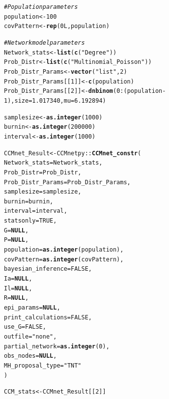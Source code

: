 \documentclass{article}\usepackage[]{graphicx}\usepackage[]{xcolor}
\makeatletter
\newcommand{\hlnum}[1]{\textcolor[rgb]{0.686,0.059,0.569}{#1}}%
\newcommand{\hlsng}[1]{\textcolor[rgb]{0.192,0.494,0.8}{#1}}%
\newcommand{\hlcom}[1]{\textcolor[rgb]{0.678,0.584,0.686}{\textit{#1}}}%
\newcommand{\hlopt}[1]{\textcolor[rgb]{0,0,0}{#1}}%
\newcommand{\hldef}[1]{\textcolor[rgb]{0.345,0.345,0.345}{#1}}%
\newcommand{\hlkwa}[1]{\textcolor[rgb]{0.161,0.373,0.58}{\textbf{#1}}}%
\newcommand{\hlkwb}[1]{\textcolor[rgb]{0.69,0.353,0.396}{#1}}%
\newcommand{\hlkwc}[1]{\textcolor[rgb]{0.333,0.667,0.333}{#1}}%
\newcommand{\hlkwd}[1]{\textcolor[rgb]{0.737,0.353,0.396}{\textbf{#1}}}%
\newenvironment{kframe}{%
 \def\at@end@of@kframe{}%
 \ifinner\ifhmode%
  \def\at@end@of@kframe{\end{minipage}}%
  \begin{minipage}{\columnwidth}%
 \fi\fi%
 \def\FrameCommand##1{\hskip\@totalleftmargin \hskip-\fboxsep
 \colorbox{shadecolor}{##1}\hskip-\fboxsep
     \hskip-\linewidth \hskip-\@totalleftmargin \hskip\columnwidth}%
 \MakeFramed {\advance\hsize-\width
   \@totalleftmargin\z@ \linewidth\hsize
   \@setminipage}}%
 {\par\unskip\endMakeFramed%
 \at@end@of@kframe}
\makeatother
\begin{document}
\begin{kframe}
\begin{alltt}
\hlcom{# Population parameters}
\hldef{population} \hlkwb{<-} \hlnum{100}
\hldef{covPattern} \hlkwb{<-} \hlkwd{rep}\hldef{(}\hlnum{0L}\hldef{, population)}

\hlcom{# Network model parameters}
\hldef{Network_stats} \hlkwb{<-} \hlkwd{list}\hldef{(}\hlkwd{c}\hldef{(}\hlsng{"Degree"}\hldef{))}
\hldef{Prob_Distr} \hlkwb{<-} \hlkwd{list}\hldef{(}\hlkwd{c}\hldef{(}\hlsng{"Multinomial_Poisson"}\hldef{))}
\hldef{Prob_Distr_Params} \hlkwb{<-} \hlkwd{vector}\hldef{(}\hlsng{"list"}\hldef{,} \hlnum{2}\hldef{)}
\hldef{Prob_Distr_Params[[}\hlnum{1}\hldef{]]} \hlkwb{<-} \hlkwd{c}\hldef{(population)}
\hldef{Prob_Distr_Params[[}\hlnum{2}\hldef{]]} \hlkwb{<-} \hlkwd{dnbinom}\hldef{(}\hlnum{0}\hlopt{:}\hldef{(population}\hlopt{-}\hlnum{1}\hldef{),} \hlkwc{size}\hldef{=}\hlnum{1.017340}\hldef{,} \hlkwc{mu}\hldef{=}\hlnum{6.192894}\hldef{)}

\hldef{samplesize} \hlkwb{<-} \hlkwd{as.integer}\hldef{(}\hlnum{1000}\hldef{)}
\hldef{burnin} \hlkwb{<-} \hlkwd{as.integer}\hldef{(}\hlnum{200000}\hldef{)}
\hldef{interval} \hlkwb{<-} \hlkwd{as.integer}\hldef{(}\hlnum{1000}\hldef{)}

\hldef{CCMnet_Result} \hlkwb{<-} \hldef{CCMnetpy}\hlopt{::}\hlkwd{CCMnet_constr}\hldef{(}
  \hlkwc{Network_stats}\hldef{=Network_stats,}
  \hlkwc{Prob_Distr}\hldef{=Prob_Distr,}
  \hlkwc{Prob_Distr_Params}\hldef{=Prob_Distr_Params,}
  \hlkwc{samplesize} \hldef{= samplesize,}
  \hlkwc{burnin}\hldef{=burnin,}
  \hlkwc{interval}\hldef{=interval,}
  \hlkwc{statsonly}\hldef{=}\hlnum{TRUE}\hldef{,}
  \hlkwc{G}\hldef{=}\hlkwa{NULL}\hldef{,}
  \hlkwc{P}\hldef{=}\hlkwa{NULL}\hldef{,}
  \hlkwc{population}\hldef{=}\hlkwd{as.integer}\hldef{(population),}
  \hlkwc{covPattern} \hldef{=} \hlkwd{as.integer}\hldef{(covPattern),}
  \hlkwc{bayesian_inference} \hldef{=} \hlnum{FALSE}\hldef{,}
  \hlkwc{Ia} \hldef{=} \hlkwa{NULL}\hldef{,}
  \hlkwc{Il} \hldef{=} \hlkwa{NULL}\hldef{,}
  \hlkwc{R} \hldef{=} \hlkwa{NULL}\hldef{,}
  \hlkwc{epi_params} \hldef{=} \hlkwa{NULL}\hldef{,}
  \hlkwc{print_calculations} \hldef{=} \hlnum{FALSE}\hldef{,}
  \hlkwc{use_G} \hldef{=} \hlnum{FALSE}\hldef{,}
  \hlkwc{outfile} \hldef{=} \hlsng{"none"}\hldef{,}
  \hlkwc{partial_network} \hldef{=} \hlkwd{as.integer}\hldef{(}\hlnum{0}\hldef{),}
  \hlkwc{obs_nodes} \hldef{=} \hlkwa{NULL}\hldef{,}
  \hlkwc{MH_proposal_type} \hldef{=} \hlsng{"TNT"}
\hldef{)}

\hldef{CCM_stats} \hlkwb{<-} \hldef{CCMnet_Result[[}\hlnum{2}\hldef{]]}


\end{alltt}
\end{kframe}
\end{document}
